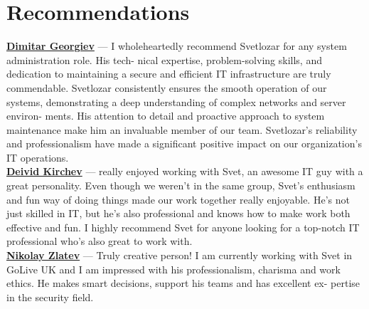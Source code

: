 \documentclass[letterpaper,10pt]{article}
\begin{document}
\begin{minipage}[t]{0.5\textwidth}
		\section*{Recommendations}
		\fontsize{11}{9}\selectfont
		 \textbf{\href{https://www.linkedin.com/in/dimitar-georgiev-29a6ab144/}{Dimitar Georgiev}} — I wholeheartedly recommend
			Svetlozar for any system administration role. His tech-
			nical expertise, problem-solving skills, and dedication to
			maintaining a secure and efficient IT infrastructure are
			truly commendable. Svetlozar consistently ensures the
			smooth operation of our systems, demonstrating a deep
			understanding of complex networks and server environ-
			ments. His attention to detail and proactive approach to
			system maintenance make him an invaluable member of
			our team. Svetlozar’s reliability and professionalism have
			made a significant positive impact on our organization’s
			IT operations.\\
			 \textbf{\href{https://www.linkedin.com/in/deivid-kirchev-00378b252/}{Deivid Kirchev}} —  really enjoyed working with Svet,
			an awesome IT guy with a great personality. Even though
			we weren’t in the same group, Svet’s enthusiasm and fun
			way of doing things made our work together really enjoyable. He’s not just skilled in IT, but he’s also professional
			and knows how to make work both effective and fun. I
			highly recommend Svet for anyone looking for a top-notch
			IT professional who’s also great to work with.\\
			 \textbf{\href{https://www.linkedin.com/in/nikolay-zlatev/}{Nikolay Zlatev}} — Truly creative person! I am currently
			working with Svet in GoLive UK and I am impressed with
			his professionalism, charisma and work ethics. He makes
			smart decisions, support his teams and has excellent ex-
			pertise in the security field.
		
	\end{minipage}
	
\end{document}
